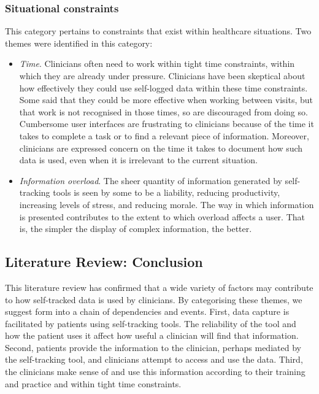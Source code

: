 \documentclass{sigchi}
\begin{document}
\subsubsection{Situational constraints}

This category pertains to constraints that exist within healthcare situations. Two themes were identified in this category:

\begin{itemize}
    \item \textit{Time}. Clinicians often need to work within tight time constraints, within which they are already under pressure. Clinicians have been skeptical about how effectively they could use self-logged data within these time constraints. Some said that they could be more effective when working between visits, but that work is not recognised in those times, so are discouraged from doing so. Cumbersome user interfaces are frustrating to clinicians because of the time it takes to complete a task or to find a relevant piece of information. Moreover, clinicians are expressed concern on the time it takes to document how such data is used, even when it is irrelevant to the current situation.
    
    \item \textit{Information overload}. The sheer quantity of information generated by self-tracking tools is seen by some to be a liability, reducing  productivity, increasing levels of stress, and reducing morale. The way in which information is presented contributes to the extent to which overload affects a user.  That is, the simpler the display of complex information, the better.
    
\end{itemize}

\subsection{Literature Review: Conclusion}

This literature review has confirmed that a wide variety of factors may contribute to how self-tracked data is used by clinicians. By categorising these themes, we suggest form into a chain of dependencies and events. First, data capture is facilitated by patients using self-tracking tools. The reliability of the tool and how the patient uses it affect how useful a clinician will find that information. Second, patients provide the information to the clinician, perhaps mediated by the self-tracking tool, and clinicians attempt to access and use the data. Third, the clinicians make sense of and use this information according to their training and practice and within tight time constraints.
\end{document}
